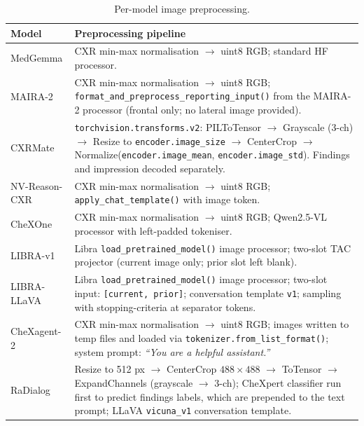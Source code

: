 \documentclass[10pt,a4paper]{article}
\begin{document}
\begin{table}[ht]
\centering
\caption{Per-model image preprocessing.}
\label{tab:preprocessing}
\small
\begin{tabular}{L{2.4cm} L{11.2cm}}
\toprule
\textbf{Model} & \textbf{Preprocessing pipeline} \\
\midrule
MedGemma
  & CXR min-max normalisation $\to$ uint8 RGB; standard HF processor. \\
\midrule
MAIRA-2
  & CXR min-max normalisation $\to$ uint8 RGB;
    \texttt{format\_and\_preprocess\_reporting\_input()} from the MAIRA-2
    processor (frontal only; no lateral image provided). \\
\midrule
CXRMate
  & \texttt{torchvision.transforms.v2}: PILToTensor $\to$ Grayscale (3-ch)
    $\to$ Resize to \texttt{encoder.image\_size} $\to$ CenterCrop $\to$
    Normalize(\texttt{encoder.image\_mean}, \texttt{encoder.image\_std}).
    Findings and impression decoded separately. \\
\midrule
NV-Reason-CXR
  & CXR min-max normalisation $\to$ uint8 RGB;
    \texttt{apply\_chat\_template()} with image token. \\
\midrule
CheXOne
  & CXR min-max normalisation $\to$ uint8 RGB;
    Qwen2.5-VL processor with left-padded tokeniser. \\
\midrule
LIBRA-v1
  & Libra \texttt{load\_pretrained\_model()} image processor;
    two-slot TAC projector (current image only; prior slot left blank). \\
\midrule
LIBRA-LLaVA
  & Libra \texttt{load\_pretrained\_model()} image processor;
    two-slot input: \texttt{[current, prior]}; conversation template
    \texttt{v1}; sampling with stopping-criteria at separator tokens. \\
\midrule
CheXagent-2
  & CXR min-max normalisation $\to$ uint8 RGB;
    images written to temp files and loaded via
    \texttt{tokenizer.from\_list\_format()};
    system prompt: \textit{``You are a helpful assistant.''}\\
\midrule
RaDialog
  & Resize to 512 px $\to$ CenterCrop $488{\times}488$ $\to$
    ToTensor $\to$ ExpandChannels (grayscale $\to$ 3-ch);
    CheXpert classifier run first to predict findings labels, which
    are prepended to the text prompt; LLaVA \texttt{vicuna\_v1}
    conversation template. \\
\bottomrule
\end{tabular}
\end{table}

\end{document}
